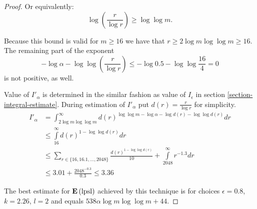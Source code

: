 \begin{proof}
Or equivalently:
\[
	\log \left( \frac{r}{\log r} \right) \geq \log \log m \text{.}
\]

Because this bound is valid for $m \geq 16$ we have that $r \geq 2 \log m \log \log m \geq 16$. The remaining part of the exponent \[ -\log \alpha - \log \log \left( \frac{r}{\log r} \right) \leq -\log 0.5 - \log \log \frac{16}{4} = 0 \] is not positive, as well. 

Value of $I'_\alpha$ is determined in the similar fashion as value of $I_\epsilon$ in section \ref{section-integral-estimate}. During estimation of $I'_\alpha$ put $d(r) = \frac{r}{\log r}$ for simplicity.
\[
\begin{split}
I'_\alpha 
	& = \int_{2 \log m \log \log m}^{\infty} d(r) ^ {\log \log m - \log \alpha - \log d(r) - \log \log d(r)} dr \\
	& \leq \int\limits_{16}^{\infty} d(r) ^ {1 - \log \log d(r)} dr \\
	& \leq \displaystyle\sum_{r \in \{16, 16.1, \dots, 2048 \}} \frac{d(r) ^ {1 - \log \log d(r)}}{10} + 
		\int\limits_{2048}^{\infty} r ^ {-1.3} dr \\
	& \leq 3.01 + \frac{2048 ^ {-0.3}}{0.3} \leq 3.36
\end{split}
\]

The best estimate for $\mathbf{E}\left(\mathrm{lpsl}\right)$ achieved by this technique is for choices $\epsilon = 0.8$, $k = 2.26$, $l = 2$ and equals $538 \alpha \log m \log \log m + 44$.
\end{proof}
